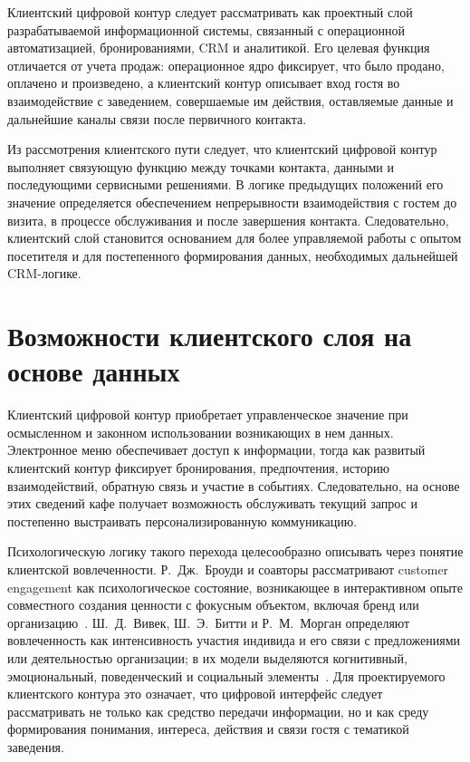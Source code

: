Клиентский цифровой контур следует рассматривать как проектный слой разрабатываемой информационной системы, связанный с операционной автоматизацией, бронированиями, CRM и аналитикой. Его целевая функция отличается от учета продаж: операционное ядро фиксирует, что было продано, оплачено и произведено, а клиентский контур описывает вход гостя во взаимодействие с заведением, совершаемые им действия, оставляемые данные и дальнейшие каналы связи после первичного контакта.

Из рассмотрения клиентского пути следует, что клиентский цифровой контур выполняет связующую функцию между точками контакта, данными и последующими сервисными решениями. В логике предыдущих положений его значение определяется обеспечением непрерывности взаимодействия с гостем до визита, в процессе обслуживания и после завершения контакта. Следовательно, клиентский слой становится основанием для более управляемой работы с опытом посетителя и для постепенного формирования данных, необходимых дальнейшей CRM-логике.

\section{Возможности клиентского слоя на основе данных}

Клиентский цифровой контур приобретает управленческое значение при осмысленном и законном использовании возникающих в нем данных. Электронное меню обеспечивает доступ к информации, тогда как развитый клиентский контур фиксирует бронирования, предпочтения, историю взаимодействий, обратную связь и участие в событиях. Следовательно, на основе этих сведений кафе получает возможность обслуживать текущий запрос и постепенно выстраивать персонализированную коммуникацию.

Психологическую логику такого перехода целесообразно описывать через понятие клиентской вовлеченности. Р.~Дж.~Броуди и соавторы рассматривают customer engagement как психологическое состояние, возникающее в интерактивном опыте совместного создания ценности с фокусным объектом, включая бренд или организацию~\cite{brodie2011}. Ш.~Д.~Вивек, Ш.~Э.~Битти и Р.~М.~Морган определяют вовлеченность как интенсивность участия индивида и его связи с предложениями или деятельностью организации; в их модели выделяются когнитивный, эмоциональный, поведенческий и социальный элементы~\cite{vivek2012}. Для проектируемого клиентского контура это означает, что цифровой интерфейс следует рассматривать не только как средство передачи информации, но и как среду формирования понимания, интереса, действия и связи гостя с тематикой заведения.

